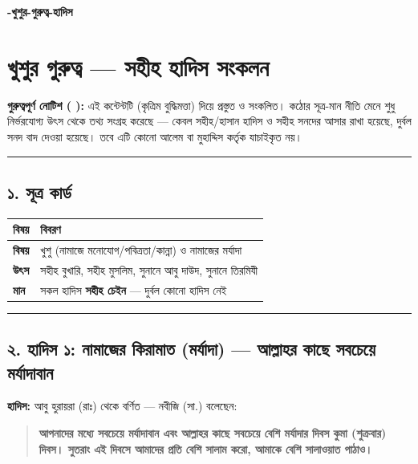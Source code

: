 

\begin{center}{\Large\bfseries\color{emerald} -খুশুর-গুরুত্ব-হাদিস}\end{center}
\vspace{1em}
\section*{খুশুর গুরুত্ব — সহীহ হাদিস সংকলন}

\begin{warnbox}
 \textbf{গুরুত্বপূর্ণ নোটিশ ( ):} এই কন্টেন্টটি  (কৃত্রিম বুদ্ধিমত্তা) দিয়ে প্রস্তুত ও সংকলিত।  কঠোর সূত্র-মান নীতি মেনে শুধু নির্ভরযোগ্য উৎস থেকে তথ্য সংগ্রহ করেছে — কেবল সহীহ/হাসান হাদিস ও সহীহ সনদের আসার রাখা হয়েছে, দুর্বল সনদ বাদ দেওয়া হয়েছে। তবে এটি কোনো আলেম বা মুহাদ্দিস কর্তৃক যাচাইকৃত নয়।
\end{warnbox}

\medskip\hrule\medskip

\subsection*{১. সূত্র কার্ড}

\begin{table}[h]\centering\small
\begin{tabular}{ll}
বিষয় & বিবরণ \\
\hline
\textbf{বিষয়} & খুশু (নামাজে মনোযোগ/পবিত্রতা/কান্না) ও নামাজের মর্যাদা \\
\textbf{উৎস} & সহীহ বুখারি, সহীহ মুসলিম, সুনানে আবু দাউদ, সুনানে তিরমিযী \\
\textbf{মান} & সকল হাদিস \textbf{সহীহ চেইন} — দুর্বল কোনো হাদিস নেই \\
\hline
\end{tabular}
\end{table}

\medskip\hrule\medskip

\subsection*{২. হাদিস ১: নামাজের কিরামাত (মর্যাদা) — আল্লাহর কাছে সবচেয়ে মর্যাদাবান}

\textbf{হাদিস:} আবু হুরায়রা (রাঃ) থেকে বর্ণিত — নবীজি (সা.) বলেছেন:

\begin{quote}
\textbf{আপনাদের মধ্যে সবচেয়ে মর্যাদাবান এবং আল্লাহর কাছে সবচেয়ে বেশি মর্যাদার দিবস কুমা (শুক্রবার) দিবস। সুতরাং এই দিবসে আমাদের প্রতি বেশি সালাম করো, আমাকে বেশি সালাওয়াত পাঠাও।}
\end{quote}

